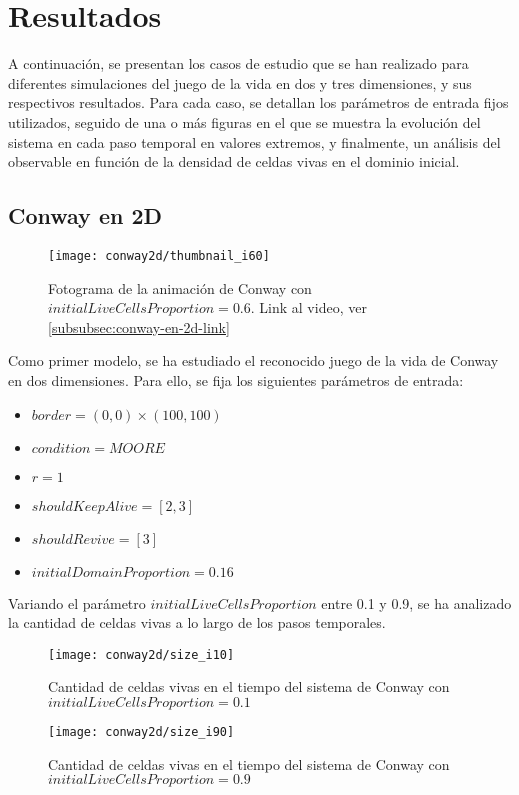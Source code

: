 \section{Resultados}\label{sec:resultados}
A continuación, se presentan los casos de estudio que se han realizado para diferentes simulaciones del juego
de la vida en dos y tres dimensiones, y sus respectivos resultados.
Para cada caso, se detallan los parámetros de entrada fijos utilizados, seguido de una o más figuras en el que
se muestra la evolución del sistema en cada paso temporal en valores extremos, y finalmente, un análisis del
observable en función de la densidad de celdas vivas en el dominio inicial.

\subsection{Conway en 2D}\label{subsec:conway-en-2d}

\begin{figure}[H]
    \centering
    \texttt{[image: conway2d/thumbnail\_i60]}
    \caption{Fotograma de la animación de Conway con $initialLiveCellsProportion = 0.6$. Link al video, ver \ref{subsubsec:conway-en-2d-link}}
    \label{fig:thumbnailconway2d_i60}
\end{figure}

Como primer modelo, se ha estudiado el reconocido juego de la vida de Conway en dos dimensiones.
Para ello, se fija los siguientes parámetros de entrada:

\begin{itemize}
    \item $border = (0, 0) \times (100, 100)$
    \item $condition = MOORE$
    \item $r = 1$
    \item $shouldKeepAlive = [2, 3]$
    \item $shouldRevive = [3]$
    \item $initialDomainProportion = 0.16$
\end{itemize}

Variando el parámetro $initialLiveCellsProportion$ entre 0.1 y 0.9, se ha analizado la cantidad de celdas vivas
a lo largo de los pasos temporales.

\begin{figure}[H]
    \centering
    \texttt{[image: conway2d/size\_i10]}
    \caption{Cantidad de celdas vivas en el tiempo del sistema de Conway con $initialLiveCellsProportion = 0.1$}
    \label{fig:conway2d_i10}
\end{figure}
\begin{figure}[H]
    \centering
    \texttt{[image: conway2d/size\_i90]}
    \caption{Cantidad de celdas vivas en el tiempo del sistema de Conway con $initialLiveCellsProportion = 0.9$}
    \label{fig:conway2d_i90}
\end{figure}

